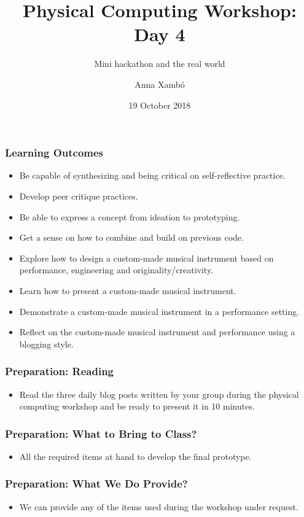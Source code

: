 \documentclass[screen, aspectratio=43]{beamer}
\title[PCW-d1]{Physical Computing Workshop: Day 4}
\subtitle{Mini hackathon and the real world}
\author[A. Xamb{\'o}]{Anna Xamb{\'o}}
\institute[NTNU]{Department of Music, NTNU}
\date{19 October 2018}
\begin{document}
\begin{frame}
  \titlepage
\end{frame}
%
\begin{frame}
  \frametitle{Learning Outcomes}
  \begin{itemize}
    \item Be capable of synthesizing and being critical on self-reflective practice. 
    \item Develop peer critique practices.
    \item Be able to express a concept from ideation to prototyping.
    \item Get a sense on how to combine and build on previous code.
    \item Explore how to design a custom-made musical instrument based on performance, engineering and originality/creativity.  
    \item Learn how to present a custom-made musical instrument.
    \item Demonstrate a custom-made musical instrument in a performance setting.
    \item Reflect on the custom-made musical instrument and performance using a blogging style.
  \end{itemize}
\end{frame}
\begin{frame}
  \frametitle{Preparation: Reading}
        \begin{itemize}
        \item Read the three daily blog posts written by your group during the physical computing workshop and be ready to present it in 10 minutes.
         \end{itemize}
\end{frame}
%
\begin{frame}
  \frametitle{Preparation: What to Bring to Class?}
        \begin{itemize}
        \item All the required items at hand to develop the final prototype.
         \end{itemize}
\end{frame}
%
\begin{frame}
  \frametitle{Preparation: What We Do Provide?}
        \begin{itemize}
        \item We can provide any of the items used during the workshop under request.       
         \end{itemize}
\end{frame}
\end{document}
